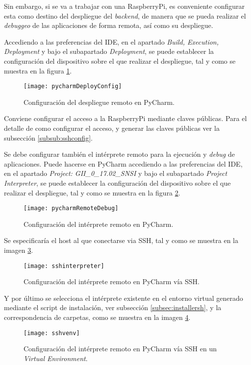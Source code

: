 Sin embargo, si se va a trabajar con una RaspberryPi, es conveniente configurar esta como destino del despliegue del \emph{backend}, de manera que se pueda realizar el \emph{debuggeo} de las aplicaciones de forma remota, así como su despliegue. 

Accediendo a las preferencias del IDE, en el apartado \emph{Build, Execution, Deployment} y bajo el subapartado \emph{Deployment}, se puede establecer la configuración del dispositivo sobre el que realizar el despliegue, tal y como se muestra en la figura \ref{fig:pycharmDeployConfig}.


\begin{figure}[H]
	\centering
	\texttt{[image: pycharmDeployConfig]}
	\caption[PyCharm. Configuración de despliegue]{Configuración del despliegue remoto en PyCharm.}\label{fig:pycharmDeployConfig}
\end{figure}

Conviene configurar el acceso a la RaspberryPi mediante claves públicas. Para el detalle de como configurar el acceso, y generar las claves públicas ver la subsección \ref{subsub:sshconfig}.

Se debe configurar también el intérprete remoto para la ejecución y \emph{debug} de aplicaciones. Puede hacerse en PyCharm accediendo a las preferencias del IDE, en el apartado \emph{Project: GII\_0\_17.02\_SNSI} y bajo el subapartado \emph{Project Interpreter}, se puede establecer la configuración del dispositivo sobre el que realizar el despliegue, tal y como se muestra en la figura \ref{fig:pycharmRemoteDebug}.

\begin{figure}[H]
	\centering
	\texttt{[image: pycharmRemoteDebug]}
	\caption[PyCharm. Configuración de intérprete remoto]{Configuración del intérprete remoto en PyCharm.}\label{fig:pycharmRemoteDebug}
\end{figure}

Se especificaría el host al que conectarse via SSH, tal y como se muestra en la imagen \ref{fig:sshinterpreter}.

\begin{figure}[H]
	\centering
	\texttt{[image: sshinterpreter]}
	\caption[PyCharm. Configuración de intérprete remoto. SSH]{Configuración del intérprete remoto en PyCharm vía SSH.}\label{fig:sshinterpreter}
\end{figure}

Y por último se selecciona el intérprete existente en el entorno virtual generado mediante el script de instalación, ver subsección \ref{subsec:installersh}, y la correspondencia de carpetas, como se muestra en la imagen \ref{fig:sshvenv}.
\begin{figure}[H]
	\centering
	\texttt{[image: sshvenv]}
	\caption[PyCharm. Configuración de intérprete remoto. VirtualEnv]{Configuración del intérprete remoto en PyCharm vía SSH en un \emph{Virtual Environment}.}\label{fig:sshvenv}
\end{figure}



